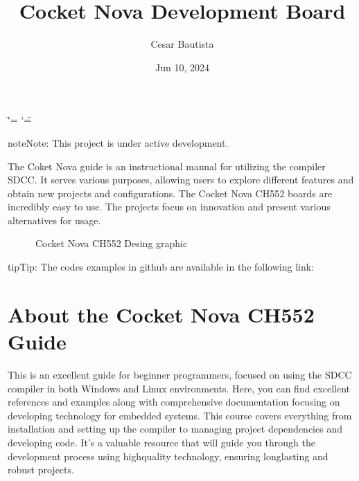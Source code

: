 \documentclass[letterpaper,10pt,english]{sphinxmanual}
\title{Cocket Nova Development Board}
\date{Jun 10, 2024}
\author{Cesar Bautista}
\begin{document}
\ifdefined\shorthandoff
  \ifnum\catcode`\=\string=\active\shorthandoff{=}\fi
  \ifnum\catcode`\"=\active{}\fi
\fi

\pagestyle{empty}
\sphinxmaketitle
\pagestyle{plain}
\sphinxtableofcontents
\pagestyle{normal}
\label{\detokenize{index::doc}}


\begin{sphinxadmonition}{note}{Note:}
\sphinxAtStartPar
This project is under active development.
\end{sphinxadmonition}

\sphinxAtStartPar
The Coket Nova guide is an instructional manual for utilizing the compiler SDCC. It serves various purposes, allowing users to explore different features and obtain new projects and
configurations.
The Cocket Nova CH552 boards are incredibly easy to use. The projects focus on innovation and
present various alternatives for usage.

\begin{figure}[htbp]
\centering
\capstart

\noindent{}
\caption{Cocket Nova CH552 Desing graphic}\label{\detokenize{index:id1}}\label{\detokenize{index:ch552}}\end{figure}

\begin{sphinxadmonition}{tip}{Tip:}
\sphinxAtStartPar
The codes examples in github are available in the following link: 
\end{sphinxadmonition}

\sphinxstepscope


\chapter{About the Cocket Nova CH552 Guide}
\label{\detokenize{about:about-the-cocket-nova-ch552-guide}}\label{\detokenize{about::doc}}
\sphinxAtStartPar
This is an excellent guide for beginner programmers, focused on using the SDCC compiler in both Windows and Linux environments.
Here, you can find excellent references and examples along with comprehensive documentation focusing on developing technology for embedded systems.
This course covers everything from installation and setting up the compiler to managing project dependencies and developing code. It’s a valuable resource that will guide you through the development process using high\sphinxhyphen{}quality technology, ensuring long\sphinxhyphen{}lasting and robust projects.
\end{document}
